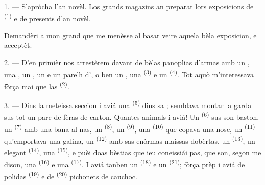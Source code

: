 %
%

\VUsaut{4.0mm}
\VUsaut{2.0mm}
\VUsaut{3.4mm}

1. --- S'apròcha l'an novèl. Los grands magazins an preparat lors exposicions de
 \textsuperscript{(1)} e de presents d'an novèl.

Demandèri a mon grand que me menèsse al basar veire aquela bèla exposicion, e
acceptèt.

2. --- D'en primièr nos arrestèrem davant de bèlas panoplias d'armas amb un
, una , un , un  e
un parelh d', o ben un , una 
\textsuperscript{(3)} e un  \textsuperscript{(4)}. Tot aquò
m'interessava fòrça mai que las 
\textsuperscript{(2)}.

\VUsaut{3.0mm}
\VUsaut{2.6mm}

3. --- Dins la meteissa seccion i aviá una 
\textsuperscript{(5)} dins sa ; semblava montar la garda sus tot un
parc de fèras de carton. Quantes animals i aviá! Un 
\textsuperscript{(6)} sus son baston, un  \textsuperscript{(7)}
amb una bana al nas, un  \textsuperscript{(8)}, un
 \textsuperscript{(9)}, una  \textsuperscript{(10)}
que copava una nose, un  \textsuperscript{(11)} qu'emportava una
galina, un  \textsuperscript{(12)} amb sas enòrmas maissas
dobèrtas, un  \textsuperscript{(13)}, un elegant 
\textsuperscript{(14)}, una  \textsuperscript{(15)}, e puèi doas
bèstias que ieu coneissiái pas, que son, segon me dison, una 
\textsuperscript{(16)} e una  \textsuperscript{(17)}. I aviá tanben un
 \textsuperscript{(18)} e un  \textsuperscript{(21)};
fòrça prèp i aviá de polidas  \textsuperscript{(19)} e de
 \textsuperscript{(20)} pichonets de cauchoc.

